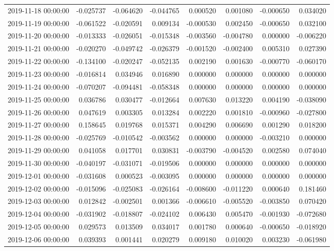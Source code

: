 \begin{tabular}{lrrrrrrr}
2019-11-18 00:00:00 & -0.025737 & -0.064620 & -0.044765 & 0.000520 & 0.001080 & -0.000650 & 0.034020 \\
2019-11-19 00:00:00 & -0.061522 & -0.020591 & 0.009134 & -0.000530 & 0.002450 & -0.000650 & 0.032100 \\
2019-11-20 00:00:00 & -0.013333 & -0.026051 & -0.015348 & -0.003560 & -0.004780 & 0.000000 & -0.006220 \\
2019-11-21 00:00:00 & -0.020270 & -0.049742 & -0.026379 & -0.001520 & -0.002400 & 0.005310 & 0.027390 \\
2019-11-22 00:00:00 & -0.134100 & -0.020247 & -0.052135 & 0.002190 & 0.001630 & -0.000770 & -0.060170 \\
2019-11-23 00:00:00 & -0.016814 & 0.034946 & 0.016890 & 0.000000 & 0.000000 & 0.000000 & 0.000000 \\
2019-11-24 00:00:00 & -0.070207 & -0.094481 & -0.058348 & 0.000000 & 0.000000 & 0.000000 & 0.000000 \\
2019-11-25 00:00:00 & 0.036786 & 0.030477 & -0.012664 & 0.007630 & 0.013220 & 0.004190 & -0.038090 \\
2019-11-26 00:00:00 & 0.047619 & 0.003305 & 0.013284 & 0.002220 & 0.001810 & -0.000960 & -0.027800 \\
2019-11-27 00:00:00 & 0.158645 & 0.019768 & 0.015371 & 0.004290 & 0.006690 & 0.001290 & 0.018200 \\
2019-11-28 00:00:00 & -0.025769 & -0.010542 & -0.003562 & 0.000000 & 0.000000 & -0.003210 & 0.000000 \\
2019-11-29 00:00:00 & 0.041058 & 0.017701 & 0.030831 & -0.003790 & -0.004520 & 0.002580 & 0.074040 \\
2019-11-30 00:00:00 & -0.040197 & -0.031071 & -0.019506 & 0.000000 & 0.000000 & 0.000000 & 0.000000 \\
2019-12-01 00:00:00 & -0.031608 & 0.000523 & -0.003095 & 0.000000 & 0.000000 & 0.000000 & 0.000000 \\
2019-12-02 00:00:00 & -0.015096 & -0.025083 & -0.026164 & -0.008600 & -0.011220 & 0.000640 & 0.181460 \\
2019-12-03 00:00:00 & 0.012842 & -0.002501 & 0.001366 & -0.006610 & -0.005520 & -0.003850 & 0.070420 \\
2019-12-04 00:00:00 & -0.031902 & -0.018807 & -0.024102 & 0.006430 & 0.005470 & -0.001930 & -0.072680 \\
2019-12-05 00:00:00 & 0.029573 & 0.013509 & 0.034017 & 0.001780 & 0.000640 & -0.000650 & -0.018920 \\
2019-12-06 00:00:00 & 0.039393 & 0.001441 & 0.020279 & 0.009180 & 0.010020 & 0.003230 & -0.061980 \\

\end{tabular}
